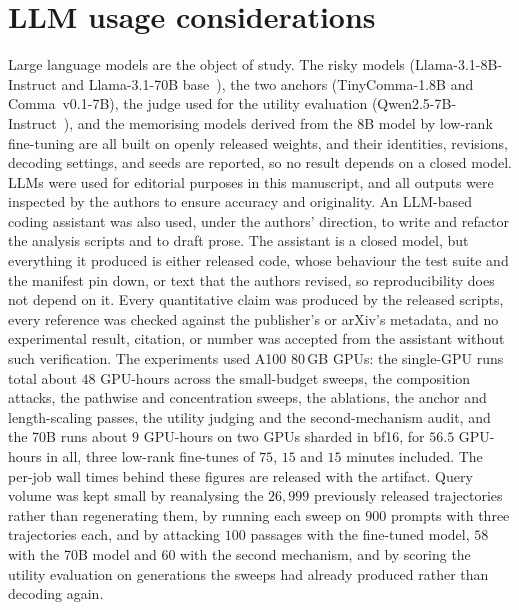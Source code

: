 \section*{LLM usage considerations}
Large language models are the object of study. The risky models (Llama-3.1-8B-Instruct and Llama-3.1-70B base~\cite{grattafiori2024llama3}), the two anchors (TinyComma-1.8B and Comma~v0.1-7B), the judge used for the utility evaluation (Qwen2.5-7B-Instruct~\cite{qwen2025qwen25}), and the memorising models derived from the 8B model by low-rank fine-tuning are all built on openly released weights, and their identities, revisions, decoding settings, and seeds are reported, so no result depends on a closed model. LLMs were used for editorial purposes in this manuscript, and all outputs were inspected by the authors to ensure accuracy and originality. An LLM-based coding assistant was also used, under the authors' direction, to write and refactor the analysis scripts and to draft prose. The assistant is a closed model, but everything it produced is either released code, whose behaviour the test suite and the manifest pin down, or text that the authors revised, so reproducibility does not depend on it. Every quantitative claim was produced by the released scripts, every reference was checked against the publisher's or arXiv's metadata, and no experimental result, citation, or number was accepted from the assistant without such verification. The experiments used A100 80\,GB GPUs: the single-GPU runs total about $48$ GPU-hours across the small-budget sweeps, the composition attacks, the pathwise and concentration sweeps, the ablations, the anchor and length-scaling passes, the utility judging and the second-mechanism audit, and the 70B runs about $9$ GPU-hours on two GPUs sharded in bf16, for $56.5$ GPU-hours in all, three low-rank fine-tunes of $75$, $15$ and $15$ minutes included. The per-job wall times behind these figures are released with the artifact. Query volume was kept small by reanalysing the $26{,}999$ previously released trajectories~\cite{vijayavallabh2026audit} rather than regenerating them, by running each sweep on $900$ prompts with three trajectories each, and by attacking $100$ passages with the fine-tuned model, $58$ with the 70B model and $60$ with the second mechanism, and by scoring the utility evaluation on generations the sweeps had already produced rather than decoding again.

